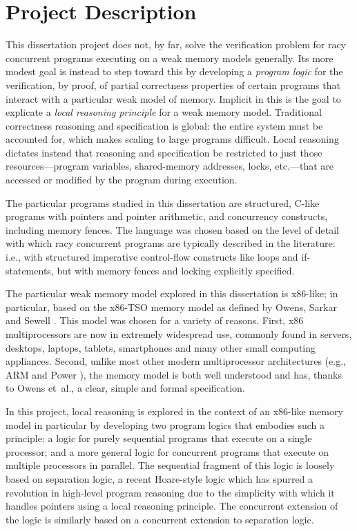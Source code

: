 \documentclass[11pt]{report}         %
\begin{document}
\section{Project Description}
\label{sec:project-description}

This dissertation project does not, by far, solve the verification problem for racy concurrent programs executing on a weak memory models generally. Its more modest goal is instead to step toward this by developing a \emph{program logic} for the verification, by proof, of partial correctness properties of certain programs that interact with a particular weak model of memory. Implicit in this is the goal to explicate a \emph{local reasoning principle} for a weak memory model. Traditional correctness reasoning and specification is global: the entire system must be accounted for, which makes scaling to large programs difficult. Local reasoning dictates instead that reasoning and specification be restricted to just those resources---program variables, shared-memory addresses, locks, etc.---that are accessed or modified by the program during execution.

The particular programs studied in this dissertation are structured, C-like programs with pointers and pointer arithmetic, and concurrency constructs, including memory fences. The language was chosen based on the level of detail with which racy concurrent programs are typically described in the literature: i.e., with structured imperative control-flow constructs like loops and if-statements, but with memory fences and locking explicitly specified. 

The particular weak memory model explored in this dissertation is x86-like; in particular, based on the x86-TSO memory model as defined by Owens, Sarkar and Sewell \cite{DBLP:conf/tphol/OwensSS09}. This model was chosen for a variety of reasons. First, x86 multiprocessors are now in extremely widespread use, commonly found in servers, desktops, laptops, tablets, smartphones and many other small computing appliances. Second, unlike most other modern multiprocessor architectures (e.g., ARM and Power \cite{DBLP:conf/popl/AlglaveFIMSSN09,DBLP:conf/pldi/SarkarSAMW11}), the memory model is both well understood and has, thanks to Owens et~al., a clear, simple and formal specification. 

In this project, local reasoning is explored in the context of an x86-like memory model in particular by developing two program logics that embodies such a principle: a logic for purely sequential programs that execute on a single processor; and a more general logic for concurrent programs that execute on multiple processors in parallel. The sequential fragment of this logic is loosely based on separation logic, a recent Hoare-style logic which has spurred a revolution in high-level program reasoning due to the simplicity with which it handles pointers using a local reasoning principle. The concurrent extension of the logic is similarly based on a concurrent extension to separation logic. 
\end{document}
